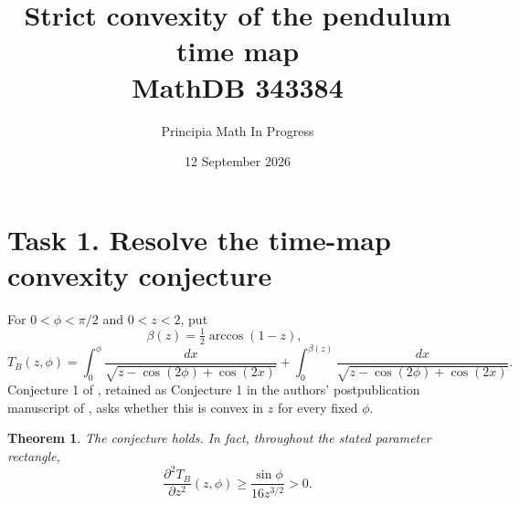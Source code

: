 \documentclass[11pt]{article}
\title{Strict convexity of the pendulum time map\\{\large MathDB 343384}}
\author{Principia Math In Progress}
\date{12 September 2026}
\newtheorem{theorem}{Theorem}
\begin{document}
\maketitle

\section*{Task 1. Resolve the time-map convexity conjecture}
For \(0<\phi<\pi/2\) and \(0<z<2\), put
\[
 \beta(z)=\tfrac12\arccos(1-z),\qquad
\]
\[
 T_B(z,\phi)=
 \int_0^\phi\frac{dx}{\sqrt{z-\cos(2\phi)+\cos(2x)}}
 +\int_0^{\beta(z)}
       \frac{dx}{\sqrt{z-\cos(2\phi)+\cos(2x)}}.
\]
Conjecture 1 of \cite{original}, retained as Conjecture 1 in the authors'
postpublication manuscript of \cite{later}, asks whether this is convex in
\(z\) for every fixed \(\phi\).

\begin{theorem}
The conjecture holds. In fact, throughout the stated parameter rectangle,
\[
 \boxed{\displaystyle
 \frac{\partial^2 T_B}{\partial z^2}(z,\phi)
       \geq \frac{\sin\phi}{16z^{3/2}}>0.}
\]
\end{theorem}
\end{document}
